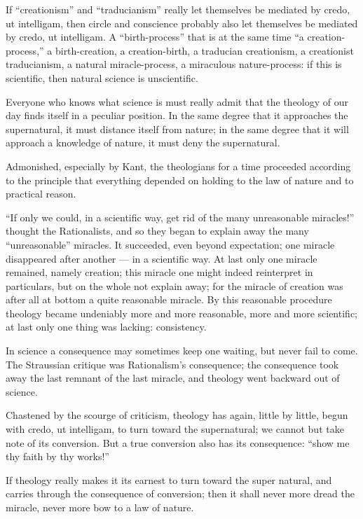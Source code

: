 \documentclass[12pt,a4paper]{article}
\begin{document}
If ``creationism'' and ``traducianism'' really let themselves be mediated by credo,
ut intelligam, then circle and conscience probably also let themselves be
mediated by credo, ut intelligam. A ``birth-process'' that is at the same time ``a
creation-process,'' a birth-creation, a creation-birth, a traducian creationism, a
creationist traducianism, a natural miracle-process, a miraculous nature-process:
if this is scientific, then natural science is unscientific.

Everyone who knows what science is must really admit that the theology of our day
finds itself in a peculiar position. In the same degree that it approaches the
supernatural, it must distance itself from nature; in the same degree that it will
approach a knowledge of nature, it must deny the supernatural.

Admonished, especially by Kant, the theologians for a time proceeded according to
the principle that everything depended on holding to the law of nature and to
practical reason.

``If only we could, in a scientific way, get rid of the many unreasonable
miracles!'' thought the Rationalists, and so they began to explain away the many
``unreasonable'' miracles. It succeeded, even beyond expectation; one miracle
disappeared after another --- in a scientific way. At last only one miracle
remained, namely creation; this miracle one might indeed reinterpret in particulars,
but on the whole not explain away; for the miracle of creation was after all at
bottom a quite reasonable miracle. By this reasonable procedure theology became
undeniably more and more reasonable, more and more scientific; at last only one
thing was lacking: consistency.

In science a consequence may sometimes keep one waiting, but never fail to come. The
Straussian critique was Rationalism's consequence; the consequence took away the
last remnant of the last miracle, and theology went backward out of science.

Chastened by the scourge of criticism, theology has again, little by little, begun
with credo, ut intelligam, to turn toward the supernatural; we cannot but take note
of its conversion. But a true conversion also has its consequence: ``show me thy
faith by thy works!''

If theology really makes it its earnest to turn toward the super%
natural, and carries through the consequence of conversion; then it shall never more
dread the miracle, never more bow to a law of nature.
\end{document}
